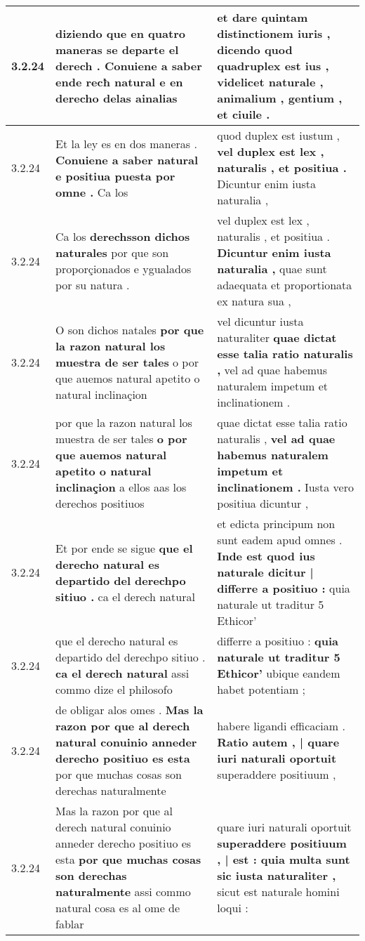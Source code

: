 \begin{tabular}{|p{1cm}|p{6.5cm}|p{6.5cm}|}
3.2.24 & diziendo que en quatro maneras se departe el derech . \textbf{ Conuiene a saber ende recħ natural } e en derecho delas ainalias & et dare quintam distinctionem iuris , \textbf{ dicendo quod quadruplex est ius , } videlicet naturale , animalium , gentium , et ciuile . \\\hline
3.2.24 & Et la ley es en dos maneras . \textbf{ Conuiene a saber natural e positiua puesta por omne . } Ca los & quod duplex est iustum , \textbf{ vel duplex est lex , naturalis , et positiua . } Dicuntur enim iusta naturalia , \\\hline
3.2.24 & Ca los \textbf{ derechsson dichos naturales } por que son proporçionados e ygualados por su natura . & vel duplex est lex , naturalis , et positiua . \textbf{ Dicuntur enim iusta naturalia , } quae sunt adaequata et proportionata ex natura sua , \\\hline
3.2.24 & O son dichos natales \textbf{ por que la razon natural los muestra de ser tales } o por que auemos natural apetito o natural inclinaçion & vel dicuntur iusta naturaliter \textbf{ quae dictat esse talia ratio naturalis , } vel ad quae habemus naturalem impetum et inclinationem . \\\hline
3.2.24 & por que la razon natural los muestra de ser tales \textbf{ o por que auemos natural apetito o natural inclinaçion } a ellos aas los derechos positiuos & quae dictat esse talia ratio naturalis , \textbf{ vel ad quae habemus naturalem impetum et inclinationem . } Iusta vero positiua dicuntur , \\\hline
3.2.24 & Et por ende se sigue \textbf{ que el derecho natural es departido del derechpo sitiuo . } ca el derech natural & et edicta principum non sunt eadem apud omnes . \textbf{ Inde est quod ius naturale dicitur | differre a positiuo : } quia naturale ut traditur 5 Ethicor’ \\\hline
3.2.24 & que el derecho natural es departido del derechpo sitiuo . \textbf{ ca el derech natural } assi commo dize el philosofo & differre a positiuo : \textbf{ quia naturale ut traditur 5 Ethicor’ } ubique eandem habet potentiam ; \\\hline
3.2.24 & de obligar alos omes . \textbf{ Mas la razon por que al derech natural conuinio anneder derecho positiuo es esta } por que muchas cosas son derechas naturalmente & habere ligandi efficaciam . \textbf{ Ratio autem , | quare iuri naturali oportuit } superaddere positiuum , \\\hline
3.2.24 & Mas la razon por que al derech natural conuinio anneder derecho positiuo es esta \textbf{ por que muchas cosas son derechas naturalmente } assi commo natural cosa es al ome de fablar & quare iuri naturali oportuit \textbf{ superaddere positiuum , | est : quia multa sunt sic iusta naturaliter , } sicut est naturale homini loqui : \\\hline

\end{tabular}
